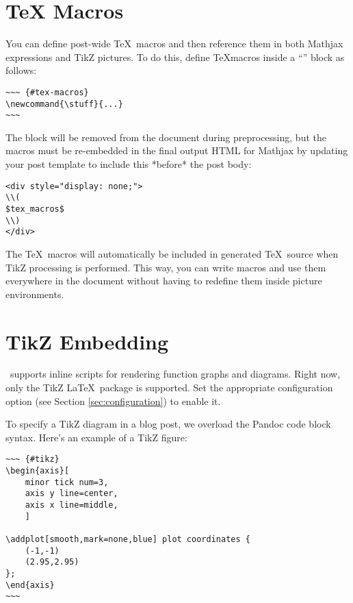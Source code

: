 \documentclass[11pt, letterpaper, oneside, titlepage]{book}
\begin{document}
\section{TeX Macros}

You can define post-wide \TeX\ macros and then reference them in both
Mathjax expressions and TikZ pictures.  To do this, define \TeX macros
inside a ``'' block as follows:

\begin{verbatim}
~~~ {#tex-macros}
\newcommand{\stuff}{...}
~~~
\end{verbatim}

The block will be removed from the document during preprocessing, but
the macros must be re-embedded in the final output HTML for Mathjax by
updating your post template to include this *before* the post body:

\begin{verbatim}
<div style="display: none;">
\\(
$tex_macros$
\\)
</div>
\end{verbatim}

The \TeX\ macros will automatically be included in generated
\TeX\ source when TikZ processing is performed.  This way, you can
write macros and use them everywhere in the document without having to
redefine them inside picture environments.

\section{TikZ Embedding}

\mathblog\ supports inline scripts for rendering function graphs and
diagrams.  Right now, only the TikZ \LaTeX\ package is supported.  Set
the appropriate configuration option (see Section
\ref{sec:configuration}) to enable it.

To specify a TikZ diagram in a blog post, we overload the Pandoc code
block syntax.  Here's an example of a TikZ figure:

\begin{verbatim}
~~~ {#tikz}
\begin{axis}[
    minor tick num=3,
    axis y line=center,
    axis x line=middle,
    ]

\addplot[smooth,mark=none,blue] plot coordinates {
    (-1,-1)
    (2.95,2.95)
};
\end{axis}
~~~
\end{verbatim}
\end{document}
